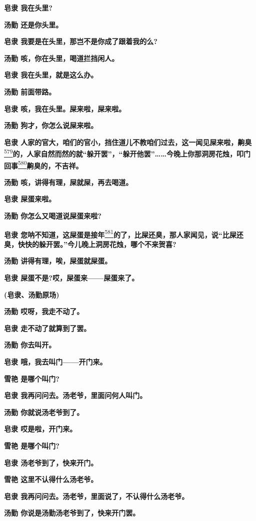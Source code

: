 \textbf{皂隶 我在头里?}

\textbf{汤勤 还是你头里。}

\textbf{皂隶 我要是在头里，那岂不是你成了跟着我的么?}

\textbf{汤勤 咳，你在头里，喝道拦挡闲人。}

\textbf{皂隶 我在头里，就是这么办。}

\textbf{汤勤 前面带路。}

\textbf{皂隶 咳，我在头里。屎来啦，屎来啦。}

\textbf{汤勤 狗才，你怎么说屎来啦。}

\textbf{皂隶
人家的官大，咱们的官小，挡住道儿不教咱们过去，这一闻见屎来啦，齁臭}\protect\hyperlink{fn579}{\textsuperscript{579}}\textbf{的，人家自然而然的就``躲开罢''，``躲开他罢''\ldots{}\ldots{}今晚上你那洞房花烛，叩门回事}\protect\hyperlink{fn580}{\textsuperscript{580}}\textbf{齁臭的，不吉祥。}

\textbf{汤勤 咳，讲得有理，屎就屎，再去喝道。}

\textbf{皂隶 屎蛋来啦。}

\textbf{汤勤 你怎么又喝道说屎蛋来啦?}

\textbf{皂隶
您呐不知道，这屎蛋是接年}\protect\hyperlink{fn581}{\textsuperscript{581}}\textbf{的了，比屎还臭，那人家闻见，说``比屎还臭，快快的躲开罢。''今儿晚上洞房花烛，哪个不来贺喜?}

\textbf{汤勤 讲得有理，唉，屎蛋就屎蛋。}

\textbf{皂隶 屎蛋不是?哎，屎蛋来------屎蛋来了。}

\textbf{(皂隶、汤勤原场)}

\textbf{汤勤 哎呀，我走不动了。}

\textbf{皂隶 走不动了就算到了罢。}

\textbf{汤勤 你去叫开。}

\textbf{皂隶 哦，我去叫门------开门来。}

\textbf{雪艳 是哪个叫门?}

\textbf{皂隶 我再问问去。汤老爷，里面问何人叫门。}

\textbf{汤勤 你就说汤老爷到了。}

\textbf{皂隶 哎是啦，开门来。}

\textbf{雪艳 是哪个叫门?}

\textbf{皂隶 汤老爷到了，快来开门。}

\textbf{雪艳 这里不认得什么汤老爷。}

\textbf{皂隶 我再问问去。汤老爷，里面说了，不认得什么汤老爷。}

\textbf{汤勤 你说是汤勤汤老爷到了，快来开门罢。}

